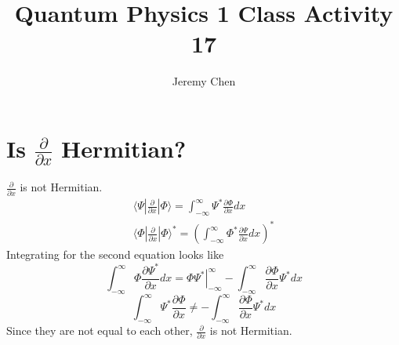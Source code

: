 \documentclass[10pt,letterpaper]{article}
\title{Quantum Physics 1 Class Activity 17}
\author{Jeremy Chen}
\begin{document}
	\maketitle
\section*{Is $\frac{\partial}{\partial x}$ Hermitian?}
$\frac{\partial}{\partial x}$ is not Hermitian. 
\begin{gather*}
\langle \Psi | \frac{\partial}{\partial x} | \Phi \rangle = \int_{-\infty}^{\infty} \Psi^{*} \frac{\partial \Phi}{\partial x} dx \\
\langle \Phi | \frac{\partial}{\partial x} | \Phi \rangle^{*} = \left(\int_{-\infty}^{\infty} \Phi^{*} \frac{\partial \Psi}{\partial x}dx\right)^{*}
\end{gather*}
Integrating for the second equation looks like
$$\int_{-\infty}^{\infty} \Phi \frac{\partial \Psi^{*}}{\partial x}dx = \left. \Phi \Psi^{*}\right\vert_{-\infty}^{\infty} - \int_{-\infty}^{\infty} \frac{\partial \Phi}{\partial x} \Psi^{*}dx$$
$$\int_{-\infty}^{\infty} \Psi^{*} \frac{\partial \Phi}{\partial x} \neq -\int_{-\infty}^{\infty} \frac{\partial \Phi}{\partial x} \Psi^{*}dx$$
Since they are not equal to each other, $\frac{\partial}{\partial x}$ is not Hermitian.
\end{document}
